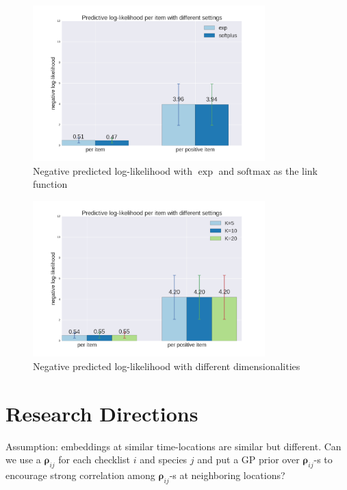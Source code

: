 \documentclass{article}
\newcommand{\wt}{\boldsymbol{\rho}}
\begin{document}
\begin{figure}[t]
    \centering
    \includegraphics[width=0.8\textwidth]{figures/link_func.png}
    \caption{Negative predicted log-likelihood with $\exp$ and $\mathrm{softmax}$ as the link function}
    \label{fig_link_func}
\end{figure}

\begin{figure}[t]
    \centering
    \includegraphics[width=0.8\textwidth]{figures/variate_K.png}
    \caption{Negative predicted log-likelihood with different dimensionalities}
    \label{fig_dimensionality}
\end{figure}






\section{Research Directions}

Assumption: embeddings at similar time-locations are similar but different. Can we use a $\wt_{ij}$ for each checklist $i$ and species $j$ and put a GP prior over $\wt_{ij}$-s to encourage strong correlation among $\wt_{ij}$-s at neighboring locations?  
\end{document}

